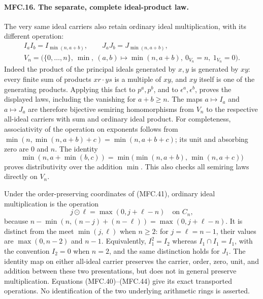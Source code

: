 \paragraph{MFC.16. The separate, complete ideal-product law.}
The very same ideal carriers also retain ordinary ideal
multiplication, with its different operation:
\[
 \begin{gathered}
 I_aI_b=I_{\min(n,a+b)},\qquad
 J_aJ_b=J_{\min(n,a+b)},\\
 V_n=\bigl(\{0,\ldots,n\},\ \min,\ (a,b)\mapsto
                   \min(n,a+b),\ 0_{V_n}=n,\ 1_{V_n}=0\bigr).
 \end{gathered}                                          \tag{MFC.42}
\]
Indeed the product of the principal ideals generated by
\(x,y\) is generated by \(xy\): every finite sum of
products \(xr\cdot ys\) is a multiple of \(xy\), and
\(xy\) itself is one of the generating products.
Applying this fact to \(p^a,p^b\), and to
\(\epsilon^a,\epsilon^b\), proves the displayed laws,
including the vanishing for \(a+b\ge n\).
The maps \(a\mapsto I_a\) and \(a\mapsto J_a\) are
therefore bijective semiring homomorphisms from \(V_n\)
to the respective all-ideal carriers with sum and
ordinary ideal product. For completeness, associativity
of the operation on exponents follows from
\(\min(n,\min(n,a+b)+c)=\min(n,a+b+c)\);
its unit and absorbing zero are \(0\) and \(n\).
The identity
\[
 \min(n,a+\min(b,c))
       =\min\bigl(\min(n,a+b),\,\min(n,a+c)\bigr)
                                                               \tag{MFC.43}
\]
proves distributivity over the addition \(\min\).
This also checks all semiring laws directly on \(V_n\).

Under the order-preserving coordinates of (MFC.41),
ordinary ideal multiplication is the operation
\[
             j\mathbin{\odot}\ell=\max(0,j+\ell-n)
             \quad\text{on }C_n,                         \tag{MFC.44}
\]
because \(n-\min(n,(n-j)+(n-\ell))=\max(0,j+\ell-n)\).
It is distinct from the meet \(\min(j,\ell)\) when
\(n\ge2\): for \(j=\ell=n-1\), their values are
\(\max(0,n-2)\) and \(n-1\). Equivalently,
\(I_1^2=I_2\) whereas \(I_1\cap I_1=I_1\), with
the convention \(I_2=0\) when \(n=2\), and the
same distinction holds for \(J_1\).
The identity map on either all-ideal carrier preserves
the carrier, order, zero, unit, and addition between
these two presentations, but does not in general
preserve multiplication. Equations (MFC.40)--(MFC.44)
give its exact transported operations. No identification
of the two underlying arithmetic rings is asserted.

